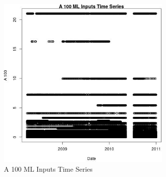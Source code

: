 \begin{figure} 
\centering  
\includegraphics[width=0.77\textwidth]{Code_Outputs/ML_input_report_ML_input_PM25_Step5_part_d_de_duplicated_aves_ML_input_A_100vDate.jpg} 
\caption{\label{fig:ML_input_report_ML_input_PM25_Step5_part_d_de_duplicated_aves_ML_inputA_100vDate}A 100 ML Inputs Time Series} 
\end{figure} 
 

